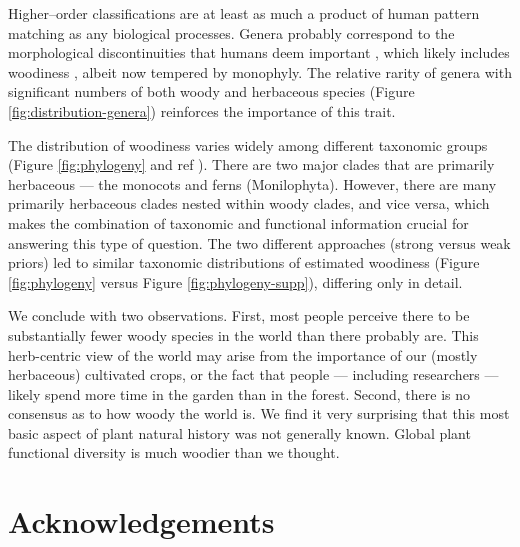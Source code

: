 \documentclass[a4paper,12pt]{article}
\begin{document}
%
Higher--order classifications are at least as much a product of human
pattern matching as any biological processes.  Genera probably
correspond to the morphological discontinuities that humans deem
important \citep{scotland2004significance}, which likely includes
woodiness \citep[e.g.,][]{Hutchinson}, albeit now tempered by
monophyly.  The relative rarity of genera with significant numbers of
both woody and herbaceous species (Figure
\ref{fig:distribution-genera}) reinforces the importance of this
trait.

The distribution of woodiness varies widely among different taxonomic
groups (Figure \ref{fig:phylogeny} and ref
\citep{sinnott1915evolution}).  There are two major clades that are
primarily herbaceous --- the monocots and ferns
(Monilophyta). However, there are many primarily herbaceous clades
nested within woody clades, and vice versa, which makes the
combination of taxonomic and functional information crucial for
answering this type of question.  The two different approaches (strong
versus weak priors) led to similar taxonomic distributions of
estimated woodiness (Figure \ref{fig:phylogeny} versus Figure
\ref{fig:phylogeny-supp}), differing only in detail.

We conclude with two observations.
%
First, most people perceive there to be substantially fewer woody
species in the world than there probably are.  This herb-centric view
of the world may arise from the importance of our (mostly herbaceous)
cultivated crops, or the fact that people --- including researchers
--- likely spend more time in the garden than in the forest.
%
Second, there is no consensus as to how woody the world is.  We find
it very surprising that this most basic aspect of plant natural
history was not generally known.  Global plant functional diversity is
much woodier than we thought.

\section{Acknowledgements}
\end{document}
